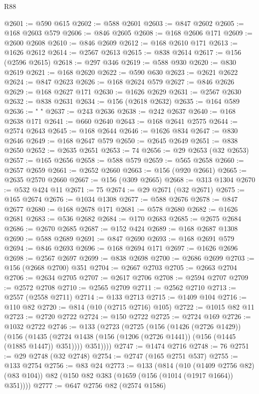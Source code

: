 \begin{lexlean}{R88}
\begin{coremodule}
@2601 := @590 @615
@2602 := @588 @2601
@2603 := @847 @2602
@2605 := @168 @2603 @579
@2606 := @846 @2605
@2608 := @168 @2606 @171
@2609 := @2600 @2608
@2610 := @846 @2609
@2612 := @168 @2610 @171
@2613 := @1626 @2612
@2614 := @2567 @2613
@2615 := @838 @2614
@2617 := @156 (@2596 @2615)
@2618 := @297 @346
@2619 := @588 @930
@2620 := @830 @2619
@2621 := @168 @2620
@2622 := @590 @630
@2623 := @2621 @2622
@2624 := @847 @2623
@2626 := @168 @2624 @579
@2627 := @846 @2626
@2629 := @168 @2627 @171
@2630 := @1626 @2629
@2631 := @2567 @2630
@2632 := @838 @2631
@2634 := @156 (@2618 @2632)
@2635 := @164 @589
@2636 := " "
@2637 := @243 @2636
@2638 := @242 @2637
@2640 := @168 @2638 @171
@2641 := @660 @2640
@2643 := @168 @2641 @2575
@2644 := @2574 @2643
@2645 := @168 @2644
@2646 := @1626 @834
@2647 := @830 @2646
@2649 := @168 @2647 @579
@2650 := @2645 @2649
@2651 := @838 @2650
@2652 := @2635 @2651
@2653 := 74
@2656 := @29 @2653 (@32 @2653)
@2657 := @165 @2656
@2658 := @588 @579
@2659 := @565 @2658
@2660 := @2657 @2659
@2661 := @2652 @2660
@2663 := @156 (@920 @2661)
@2665 := @2635 @2570 @2660
@2667 := @156 (@309 @2665)
@2668 := @313 @1304
@2670 := @532 @424 @11
@2671 := 75
@2674 := @29 @2671 (@32 @2671)
@2675 := @165 @2674
@2676 := @1034 @1308
@2677 := @588 @2676
@2678 := @847 @2677
@2680 := @168 @2678 @171
@2681 := @578 @2680
@2682 := @1626 @2681
@2683 := @536 @2682
@2684 := @170 @2683
@2685 := @2675 @2684
@2686 := @2670 @2685
@2687 := @152 @424
@2689 := @168 @2687 @1308
@2690 := @588 @2689
@2691 := @847 @2690
@2693 := @168 @2691 @579
@2694 := @846 @2693
@2696 := @168 @2694 @171
@2697 := @1626 @2696
@2698 := @2567 @2697
@2699 := @838 @2698
@2700 := @2686 @2699
@2703 := @156 (@2668 @2700) @351
@2704 := @2667 @2703
@2705 := @2663 @2704
@2706 := @2634 @2705
@2707 := @2617 @2706
@2708 := @2594 @2707
@2709 := @2572 @2708
@2710 := @2565 @2709
@2711 := @2562 @2710
@2713 := @2557 (@2558 @2711)
@2714 := @133 @2713
@2715 := @1409 @104
@2716 := @110 @82
@2720 := @814 (@10 (@2715 @2716) @105)
@2722 := @1015 @82 @11
@2723 := @2720 @2722
@2724 := @150 @2722
@2725 := @2724 @169
@2726 := @1032 @2722
@2746 := @133
    (@2723
      (@2725
        (@156
          (@1426 (@2726 @1429))
          (@156
            (@1435 (@2724 @1438 (@156 (@1206 (@2726 @1441)) (@156 (@1445 (@1885 @1447)) @351))))
            @351))))
@2747 := @1474 @2716
@2748 := 76
@2751 := @29 @2748 (@32 @2748)
@2754 := @2747 (@165 @2751 @537)
@2755 := @133 @2754
@2756 := @83 @24
@2773 := @133
    (@814
      (@10 (@1409 @2756 @82) (@83 @104))
      @82
      (@150 @82 @383 (@1659 (@156 (@1014 (@1917 @1664)) @351))))
@2777 := @647 @2756 @82 (@2574 @1586)

\end{coremodule}
\end{lexlean}
